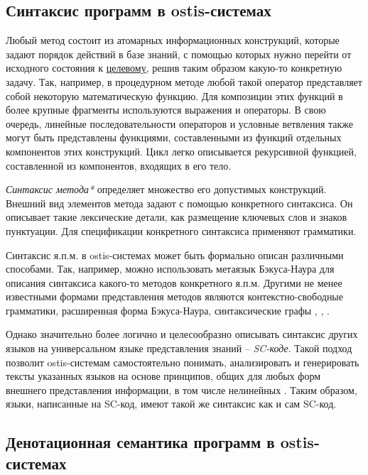 \subsection{Синтаксис программ в ostis-системах}
\label{sec_programs_method_syntax}

Любый метод состоит из атомарных информационных конструкций, которые задают порядок действий в базе знаний, с помощью которых нужно перейти от исходного состояния к \underline{целевому}, решив таким образом какую-то конкретную задачу. Так, например, в процедурном методе любой такой оператор представляет собой некоторую математическую функцию. Для композиции этих функций в более крупные фрагменты используются выражения и операторы. В свою очередь, линейные последовательности операторов и условные ветвления также могут быть представлены функциями, составленными из функций отдельных компонентов этих конструкций. Цикл легко описывается рекурсивной функцией, составленной из компонентов, входящих в его тело.

\textit{Синтаксис метода*} определяет множество его допустимых конструкций. Внешний вид элементов метода задают с помощью конкретного синтаксиса. Он описывает такие лексические детали, как размещение ключевых слов и знаков пунктуации. Для спецификации конкретного синтаксиса применяют грамматики.

Синтаксис я.п.м. в ostis-системах может быть формально описан различными способами. Так, например, можно использовать метаязык Бэкуса-Наура для описания синтаксиса какого-то методов конкретного я.п.м. Другими не менее известными формами представления методов являются контекстно-свободные грамматики, расширенная форма Бэкуса-Наура, синтаксические графы \cite{Sebesta2012}, \cite{Scott2006}, \cite{Scott1972}.

Однако значительно более логично и целесообразно описывать синтаксис других языков на универсальном языке представления знаний -- \textit{SC-коде}. Такой подход позволит ostis-системам самостоятельно понимать, анализировать и генерировать тексты указанных языков на основе принципов, общих для любых форм внешнего представления информации, в том числе нелинейных \cite{Petrov1978}. Таким образом, языки, написанные на SC-код, имеют такой же синтаксис как и сам SC-код.

\subsection{Денотационная семантика программ в ostis-системах}
\label{sec_programs_method_den_semantic}

